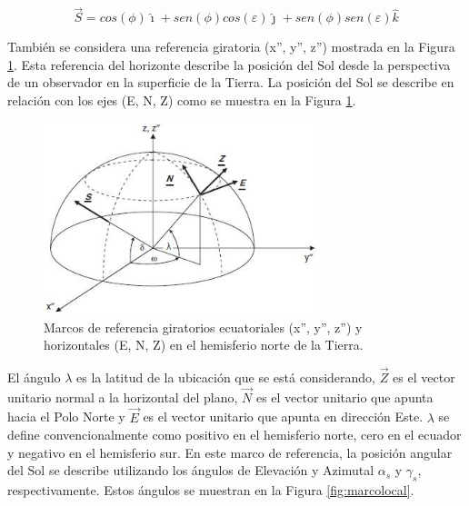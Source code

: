 \begin{equation}\label{eq:vectorS}
\vec S = cos(\phi)\hat{\imath} + sen(\phi)cos(\varepsilon)\hat{\jmath} + sen(\phi)sen(\varepsilon)\hat{k}
\end{equation}

También se considera una referencia giratoria (x'', y'', z'') mostrada en la Figura \ref{fig:marcopolo}. Esta referencia del horizonte describe la posición del Sol desde la perspectiva de un observador en la superficie de la Tierra. La posición del Sol se describe en relación con los ejes (E, N, Z) como se muestra en la Figura \ref{fig:marcopolo}. 


\begin{figure}[H]
	\centering
	\includegraphics[width=8cm]{imagenes/marcopolo}
	\caption{Marcos de referencia giratorios ecuatoriales (x'', y'', z'') y horizontales (E, N, Z) en el hemisferio norte de la Tierra.}
	\label{fig:marcopolo}
\end{figure}

El ángulo $ \lambda $ es la latitud de la ubicación que se está considerando, $ \vec Z $ es el vector unitario normal a la horizontal del plano, $ \vec N $ es el vector unitario que apunta hacia el Polo Norte y $ \vec E $ es el vector unitario que apunta en dirección Este. $ \lambda $ se define convencionalmente como positivo en el hemisferio norte, cero en el ecuador y negativo en el hemisferio sur. En este marco de referencia, la posición angular del Sol se describe utilizando los ángulos de Elevación y Azimutal $ \alpha_s $ y $ \gamma_s $, respectivamente. Estos ángulos se muestran en la Figura \ref{fig:marcolocal}.

